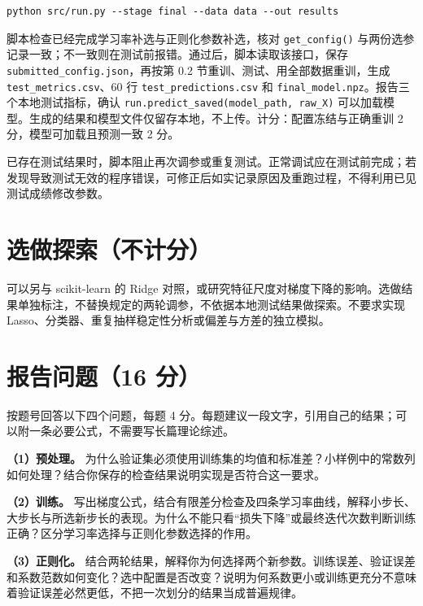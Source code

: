 \documentclass[11pt,a4paper]{article}
\newcommand{\code}[1]{{\small\nolinkurl{#1}}}
\begin{document}
\par{}\noindent\begin{minipage}{\linewidth}
\begin{lstlisting}[aboveskip=0pt,belowskip=0pt]
python src/run.py --stage final --data data --out results
\end{lstlisting}
\end{minipage}\par{}
脚本检查已经完成学习率补选与正则化参数补选，核对 \code{get_config()} 与两份选参记录一致；不一致则在测试前报错。通过后，脚本读取该接口，保存 \code{submitted_config.json}，再按第 0.2 节重训、测试、用全部数据重训，生成 \code{test_metrics.csv}、60 行 \code{test_predictions.csv} 和 \code{final_model.npz}。报告三个本地测试指标，确认 {\small\texttt{run.predict\_saved(model\_path, raw\_X)}} 可以加载模型。生成的结果和模型文件仅留存本地，不上传。计分：配置冻结与正确重训 2 分，模型可加载且预测一致 2 分。

已存在测试结果时，脚本阻止再次调参或重复测试。正常调试应在测试前完成；若发现导致测试无效的程序错误，可修正后如实记录原因及重跑过程，不得利用已见测试成绩修改参数。


\section{选做探索（不计分）}
可以另与 scikit-learn 的 Ridge 对照，或研究特征尺度对梯度下降的影响。选做结果单独标注，不替换规定的两轮调参，不依据本地测试结果做探索。不要求实现 Lasso、分类器、重复抽样稳定性分析或偏差与方差的独立模拟。


\section{报告问题（16 分）}
按题号回答以下四个问题，每题 4 分。每题建议一段文字，引用自己的结果；可以附一条必要公式，不需要写长篇理论综述。

\textbf{（1）预处理。} 为什么验证集必须使用训练集的均值和标准差？小样例中的常数列如何处理？结合你保存的检查结果说明实现是否符合这一要求。

\textbf{（2）训练。} 写出梯度公式，结合有限差分检查及四条学习率曲线，解释小步长、大步长与所选新步长的表现。为什么不能只看“损失下降”或最终迭代次数判断训练正确？区分学习率选择与正则化参数选择的作用。

\textbf{（3）正则化。} 结合两轮结果，解释你为何选择两个新参数。训练误差、验证误差和系数范数如何变化？选中配置是否改变？说明为何系数更小或训练更充分不意味着验证误差必然更低，不把一次划分的结果当成普遍规律。
\end{document}

